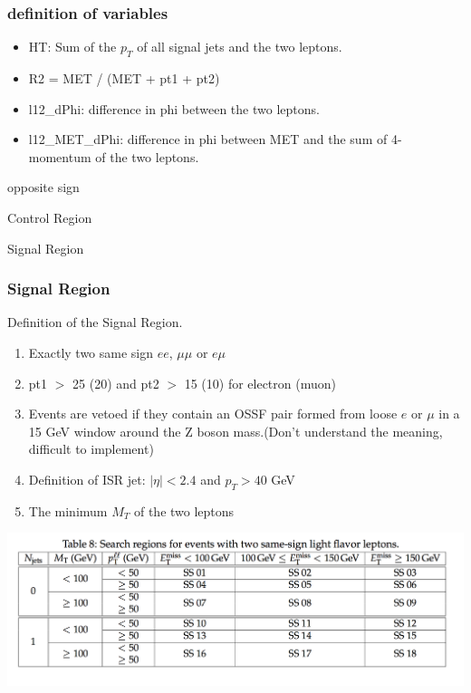 \documentclass[mathserif,serif]{beamer}
\begin{document}
\begin{frame}
\frametitle{definition of variables}
\normalsize
\begin{itemize}
\item HT: Sum of the $p_T$ of all signal jets and the two leptons.
\item R2 = MET / (MET + pt1 + pt2)
\item l12\_dPhi: difference in phi between the two leptons.
\item l12\_MET\_dPhi: difference in phi between MET and the sum of 4-momentum of the two leptons.
\end{itemize}
\end{frame}

\begin{frame}
\begin{center}
\huge
opposite sign
\end{center}
\end{frame}


%



\begin{frame}
\begin{center}
\huge
Control Region
\end{center}
\end{frame}





\begin{frame}
\begin{center}
\huge
Signal Region
\end{center}
\end{frame}

\begin{frame}
\frametitle{Signal Region}
Definition of the Signal Region.
\begin{enumerate}
\item Exactly two same sign $ee$, $\mu\mu$ or $e\mu$
\item pt1 $>$ 25 (20) and pt2 $>$ 15 (10) for electron (muon)
\item Events are vetoed if they contain an OSSF pair formed from loose $e$ or $\mu$ in a 15 GeV window around the Z boson mass.(Don't understand the meaning, difficult to implement)
\item Definition of ISR jet: $|\eta| < 2.4$ and $p_T > 40$ GeV
\item The minimum $M_T$ of the two leptons
\end{enumerate}
\includegraphics[width=1\textwidth]{data/photo/SR.png}
\end{frame}
\end{document}
